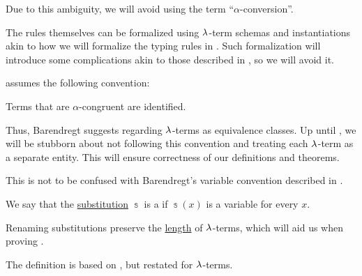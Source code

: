 \begin{comments}
  Due to this ambiguity, we will avoid using the term \enquote{\( \alpha \)-conversion}.

  \item The rules themselves can be formalized using \( {\mathrm \lambda} \)-term schemas and instantiations akin to how we will formalize the typing rules in . Such formalization will introduce some complications akin to those described in , so we will avoid it.
\end{comments}

\begin{remark}\label{rem:barendregt_convention}
   assumes the following convention:
  \begin{displayquote}
    Terms that are \( \alpha \)-congruent are identified.
  \end{displayquote}

  Thus, Barendregt suggests regarding \( {\mathrm \lambda} \)-terms as equivalence classes. Up until , we will be stubborn about not following this convention and treating each \( {\mathrm \lambda} \)-term as a separate entity. This will ensure correctness of our definitions and theorems.
\end{remark}
\begin{comments}
  \item This is not to be confused with Barendregt's variable convention described in .
\end{comments}

\begin{definition}\label{def:lambda_renaming}
  We say that the \hyperref[def:lambda_term_substitution]{substitution} \( \Bbbs \) is a  if \( \Bbbs(x) \) is a variable for every \( x \).
\end{definition}
\begin{comments}
  \item Renaming substitutions preserve the \hyperref[def:lambda_term_length]{length} of \( {\mathrm \lambda} \)-terms, which will aid us when proving .

  \item The definition is based on \cite[252]{Mimram2020ProgramEqualsProof}, but restated for \( {\mathrm \lambda} \)-terms.
\end{comments}

